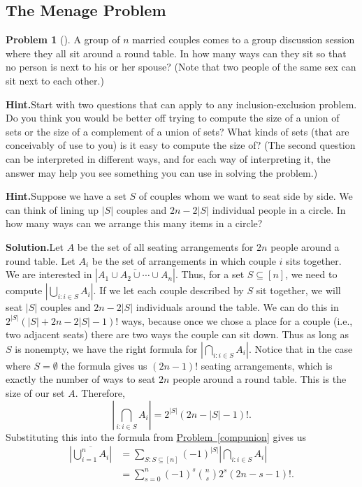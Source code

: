 \documentclass[10pt,]{book}
\theoremstyle{plain}
\theoremstyle{definition}
\newtheorem{activity}[project]{Problem}
\theoremstyle{definition}
\numberwithin{equation}{chapter}
\begin{document}
\subsection[{The Menage Problem}]{The Menage Problem}\label{sec-menage}
\begin{activity}[]\label{relaxedmenage}
A group of \(n\) married couples comes to a group discussion session where they all sit around a round table. In how many ways can they sit so that no person is next to his or her spouse? (Note that two people of the same sex can sit next to each other.)%
\par\medskip\noindent%
\textbf{Hint.}\quad Start with two questions that can apply to any inclusion-exclusion problem. Do you think you would be better off trying to compute the size of a union of sets or the size of a complement of a union of sets? What kinds of sets (that are conceivably of use to you) is it easy to compute the size of? (The second question can be interpreted in different ways, and for each way of interpreting it, the answer may help you see something you can use in solving the problem.)%
\par\medskip\noindent%
\textbf{Hint.}\quad Suppose we have a set \(S\) of couples whom we want to seat side by side. We can think of lining up \(|S|\) couples and \(2n - 2|S|\) individual people in a circle.  In how many ways can we arrange this many items in a circle?%
\par\medskip\noindent%
\textbf{Solution.}\quad Let \(A\) be the set of all seating arrangements for \(2n\) people around a round table. Let \(A_i\) be the set of arrangements in which couple \(i\) sits together. We are interested in \(|\overline{A_1\cup A_2\cup \cdots \cup A_n}|\). Thus, for a set \(S\subseteq [n]\), we need to compute \(\left|\bigcup_{i\colon i\in S} A_i\right|\). If we let each couple described by \(S\) sit together, we will seat \(|S|\) couples and \(2n-2|S|\) individuals around the table. We can do this in \(2^{|S|}(|S| + 2n-2 |S|-1)!\) ways, because once we chose a place for a couple (i.e.\@, two adjacent seats) there are two ways the couple can sit down. Thus as long as \(S\) is nonempty, we have the right formula for \(\left|\bigcap_{i\colon i\in S} A_i\right|\). Notice that in the case where \(S=\emptyset\) the formula gives us \((2n-1)!\) seating arrangements, which is exactly the number of ways to seat \(2n\) people around a round table. This is the size of our set \(A\). Therefore,%
\begin{equation*}
\left|\bigcap_{i\colon i\in S} A_i\right| = 2^{|S|}(2n-|S|-1)!\text{.}
\end{equation*}
Substituting this into the formula from \hyperref[compunion]{Problem~\ref{compunion}} gives us%
\begin{align*}
\left|\overline{\bigcup_{i=1}^n A_i}\right| &=  \sum_{S:S\subseteq [n]}
(-1)^{|S|} \left|\bigcap_{i\colon i\in S} A_i\right|\\
&= \sum_{s=0}^n(-1)^s\binom{n}{s}2^{s}(2n- s-1)!\text{.}
\end{align*}
%
\end{activity}
\end{document}
